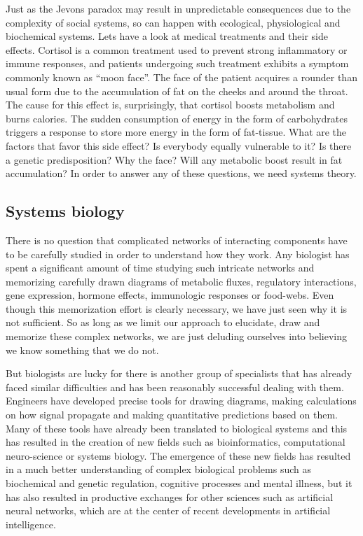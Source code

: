 \documentclass[12pt]{article}
\begin{document}
Just as the Jevons paradox may result in unpredictable consequences due to the complexity of social systems, so can happen with ecological, physiological and biochemical systems. Lets have a look at medical treatments and their side effects. Cortisol is a common treatment used to prevent strong inflammatory or immune responses, and patients undergoing such treatment exhibits a symptom commonly known as ``moon face''. The face of the patient acquires a rounder than usual form due to the accumulation of fat on the cheeks and around the throat. The cause for this effect is, surprisingly, that cortisol boosts metabolism and burns calories. The sudden consumption of energy in the form of carbohydrates triggers a response to store more energy in the form of fat-tissue. What are the factors that favor this side effect? Is everybody equally vulnerable to it? Is there a genetic predisposition? Why the face? Will any metabolic boost result in fat accumulation? In order to answer any of these questions, we need systems theory.


\subsection{Systems biology}

There is no question that complicated networks of interacting components have to be carefully studied in order to understand how they work. Any biologist has spent a significant amount of time studying such intricate networks and memorizing carefully drawn diagrams of metabolic fluxes, regulatory interactions, gene expression, hormone effects, immunologic responses or food-webs. Even though this memorization effort is clearly necessary, we have just seen why it is not sufficient. So as long as we limit our approach to elucidate, draw and memorize these complex networks, we are just deluding ourselves into  believing we know something that we do not.

But biologists are lucky for there is another group of specialists that has already faced similar difficulties and has been reasonably successful dealing with them. Engineers have developed precise tools for drawing diagrams, making calculations on how signal propagate and making quantitative predictions based on them. Many of these tools have already been translated to biological systems and this has resulted in the creation of new fields such as bioinformatics, computational neuro-science or systems biology. The emergence of these new fields has resulted in a much better understanding of complex biological problems such as biochemical and genetic regulation, cognitive processes and mental illness, but it has also resulted in productive exchanges for other sciences such as artificial neural networks, which are at the center of recent developments in artificial intelligence.
\end{document}
